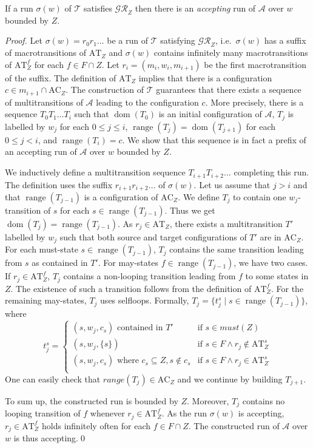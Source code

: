 \documentclass{llncs}
\newcommand{\mA}{\mathcal{A}}
\newcommand{\mGR}{\mathcal{GR}}
\newcommand{\mT}{\mathcal{T}}
\newcommand{\AC}{\mathrm{AC}}
\newcommand{\AT}[1]{\mathrm{AT}_{\!#1}}
\newcommand{\must}{\mathit{must}}
\DeclareMathOperator*{\range}{{range}}
\DeclareMathOperator*{\dom}{{dom}}
\begin{document}
\begin{lemma}\label{lem:ga}
If a run $\sigma(w)$ of $\mT$ satisfies $\mathcal{GR}_Z$ then there is
an \emph{accepting} run of $\mA$ over $w$ bounded by $Z$.
\end{lemma}
\begin{proof}
  Let $\sigma(w)=r_0r_1\ldots$ be a run of $\mT$ satisfying $\mGR_Z$,
  i.e.~$\sigma(w)$ has a suffix of macrotransitions of $\AT{Z}$ and
  $\sigma(w)$ contains infinitely many macrotransitions of $\AT{Z}^f$ for
  each $f \in F \cap Z$.  Let $r_i=(m_i,w_i,m_{i+1})$ be the first
  macrotransition of the suffix.  The definition of $\AT{Z}$ implies that
  there is a configuration $c\in m_{i+1}\cap\AC_Z$.  The construction of
  $\mT$ guarantees that there exists a sequence of multitransitions of $\mA$
  leading to the configuration $c$. More precisely, there is a sequence
  $T_0T_1\ldots T_i$ such that $\dom(T_0)$ is an initial configuration of
  $\mA$, $T_j$ is labelled by $w_j$ for each $0\le j\le i$,
  $\range(T_j)=\dom(T_{j+1})$ for each $0\le j<i$, and $\range(T_i)=c$.  We
  show that this sequence is in fact a prefix of an accepting run of $\mA$
  over $w$ bounded by $Z$. 

  We inductively define a multitransition sequence $T_{i+1}T_{i+2}\ldots$
  completing this run.  The definition uses the suffix
  $r_{i+1}r_{i+2}\ldots$ of $\sigma(w)$.  Let us assume that $j>i$ and that
  $\range(T_{j-1})$ is a configuration of $\AC_Z$.  We define $T_j$ to
  contain one $w_j$-transition of $s$ for each $s\in\range(T_{j-1})$.  Thus
  we get $\dom(T_j)=\range(T_{j-1})$.  As $r_j\in\AT{Z}$, there exists a
  multitransition $T'$ labelled by $w_j$ such that both source and target
  configurations of $T'$ are in $\AC_Z$.  For each must-state
  $s\in\range(T_{j-1})$, $T_j$ contains the same transition leading from $s$
  as contained in $T'$.  For may-states $f\in\range(T_{j-1})$, we have two
  cases.  If $r_j\in\AT{Z}^f$, $T_j$ contains a non-looping transition
  leading from $f$ to some states in $Z$.  The existence of such a
  transition follows from the definition of $\AT{Z}^f$.  For the remaining
  may-states, $T_j$ uses selfloops.
Formally, $T_j = \{ t_j^{s} \mid s\in\range(T_{j-1})\}$, where
$$
t_{j}^{s} = 
\begin{cases}
(s,w_j,c_s) \text{ contained in }  T' & \text{if } s \in \must(Z) \\
(s,w_j,\{s\}) & \text{if } s \in F \land r_j \notin \AT{Z}^s \\
(s,w_j,c_s) \text{ where } c_s\subseteq Z, s \notin c_s & \text{if } 
s \in F \land r_j \in \AT{Z}^s \\
\end{cases}
$$
One can easily check that $range(T_j)\in\AC_Z$ and we continue by building
$T_{j+1}$.  

To sum up, the constructed run is bounded by $Z$.  Moreover, $T_j$ contains
no looping transition of $f$ whenever $r_j\in\AT{Z}^f$. As the run
$\sigma(w)$ is accepting, $r_j\in\AT{Z}^f$ holds infinitely often for each
$f\in F\cap Z$. The constructed run of $\mA$ over $w$ is thus accepting.\qed
\end{proof}
\end{document}
